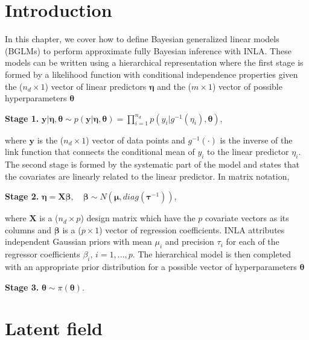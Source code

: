 \documentclass[a4paper,11pt]{report}
\def\bs#1{\ensuremath{\boldsymbol{#1}}} %
\begin{document}
\section{Introduction}\label{bglm:sec:intro}

In this chapter, we cover how to define Bayesian generalized linear
models (BGLMs) to perform approximate fully Bayesian inference with
INLA. These models can be written using a hierarchical representation
where the first stage is formed by a likelihood function with
conditional independence properties given the ($n_d \times 1$) vector
of linear predictors $\bs{\eta}$ and the ($m \times 1$) vector of
possible hyperparameters $\bs{\theta}$
\begin{list}{}{\leftmargin=5em}
\item[\textbf{Stage 1.}] $\bs{y}|\bs{\eta},\bs{\theta} \sim
    p(\bs{y}|\bs{\eta},\bs{\theta}) = \prod _{i=1}^{n_d} p(y_i|g^{-1}
    (\eta _i), \bs{\theta})$,
\end{list}
where $\bs{y}$ is the ($n_d \times 1$) vector of data points and
$g^{-1}(\cdot)$ is the inverse of the link function that connects the
conditional mean of $y_i$ to the linear predictor $\eta _i$.  The
second stage is formed by the systematic part of the model and states
that the covariates are linearly related to the linear predictor. In
matrix notation,
\begin{list}{}{\leftmargin=5em}
\item[\textbf{Stage 2.}] $\bs{\eta} = \bs{X} \bs{\beta}, \quad
    \bs{\beta} \sim N(\bs{\mu}, diag(\bs{\tau}^{-1}))$,
\end{list}
where $\bs{X}$ is a ($n_d \times p$) design matrix which have the $p$
covariate vectors as its columns and $\bs{\beta}$ is a ($p \times 1$)
vector of regression coefficients. INLA attributes independent
Gaussian priors with mean $\mu _i$ and precision $\tau_i$ for each of
the regressor coefficients $\beta_i$, $i = 1,...,p$.  The hierarchical
model is then completed with an appropriate prior distribution for a
possible vector of hyperparameters $\bs{\theta}$
\begin{list}{}{\leftmargin=5em}
  \item[\textbf{Stage 3.}] $\bs{\theta} \sim \pi(\bs{\theta})$.
\end{list}

\section{Latent field}
\end{document}
